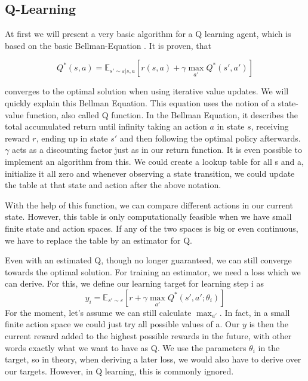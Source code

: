 \documentclass[hyperref,german,beleg]{cgvpub}
\begin{document}
\subsection{Q-Learning}

At first we will present a very basic algorithm for a Q learning agent, which is based on the basic Bellman-Equation \cite{bellmanTheoryDynamicProgramming1954}. It is proven, that

\begin{equation}
Q^*(s, a) = \mathbb{E}_{s' \sim \varepsilon | s,a}[r(s,a) + \gamma\max_{a'}Q^*(s', a')]
\end{equation}

converges to the optimal solution when using iterative value updates. We will quickly explain this Bellman Equation. This equation uses the notion of a state-value function, also called Q function. In the Bellman Equation, it describes the total accumulated return until infinity taking an action $a$ in state $s$, receiving reward $r$, ending up in state $s'$ and then following the optimal policy afterwards. $\gamma$ acts as a discounting factor just as in our return function. It is even possible to implement an algorithm from this. We could create a lookup table for all s and a, initialize it all zero and whenever observing a state transition, we could update the table at that state and action after the above notation.

With the help of this function, we can compare different actions in our current state. However, this table is only computationally feasible when we have small finite state and action spaces. If any of the two spaces is big or even continuous, we have to replace the table by an estimator for Q.

Even with an estimated Q, though no longer guaranteed, we can still converge towards the optimal solution. For training an estimator, we need a loss which we can derive. For this, we define our learning target for learning step i as
\begin{equation}
y_i = \mathbb{E}_{s' \sim \varepsilon}[r + \gamma \max_{a'}Q^*(s', a';\theta_{i})]
\end{equation}
For the moment, let's assume we can still calculate $\max_{a'}$. In fact, in a small finite action space we could just try all possible values of a. Our $y$ is then the current reward added to the highest possible rewards in the future, with other words exactly what we want to have as Q. We use the parameters $\theta_{i}$ in the target, so in theory, when deriving a later loss, we would also have to derive over our targets. However, in Q learning, this is commonly ignored.
\end{document}
